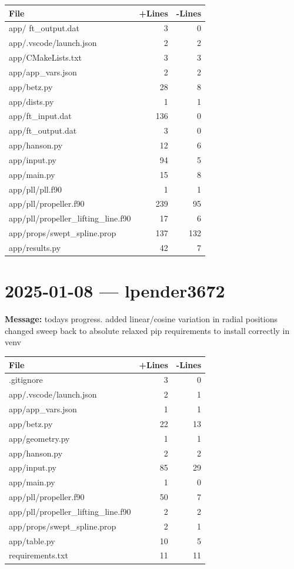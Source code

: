 \documentclass{article}
\begin{document}
\begin{longtable}{|p{10cm}|r|r|}
\hline \textbf{File} & \textbf{+Lines} & \textbf{-Lines} \\
\hline
app/ ft\_output.dat & 3 & 0 \\
\hline
app/.vscode/launch.json & 2 & 2 \\
\hline
app/CMakeLists.txt & 3 & 3 \\
\hline
app/app\_vars.json & 2 & 2 \\
\hline
app/betz.py & 28 & 8 \\
\hline
app/dists.py & 1 & 1 \\
\hline
app/ft\_input.dat & 136 & 0 \\
\hline
app/ft\_output.dat & 3 & 0 \\
\hline
app/hanson.py & 12 & 6 \\
\hline
app/input.py & 94 & 5 \\
\hline
app/main.py & 15 & 8 \\
\hline
app/pll/pll.f90 & 1 & 1 \\
\hline
app/pll/propeller.f90 & 239 & 95 \\
\hline
app/pll/propeller\_lifting\_line.f90 & 17 & 6 \\
\hline
app/props/swept\_spline.prop & 137 & 132 \\
\hline
app/results.py & 42 & 7 \\
\hline
\end{longtable}

\section*{2025-01-08 --- lpender3672}
\textbf{Message:} todays progress. added linear/cosine variation in radial positions changed sweep back to absolute relaxed pip requirements to install correctly in venv

\begin{longtable}{|p{10cm}|r|r|}
\hline \textbf{File} & \textbf{+Lines} & \textbf{-Lines} \\
\hline
.gitignore & 3 & 0 \\
\hline
app/.vscode/launch.json & 2 & 1 \\
\hline
app/app\_vars.json & 1 & 1 \\
\hline
app/betz.py & 22 & 13 \\
\hline
app/geometry.py & 1 & 1 \\
\hline
app/hanson.py & 2 & 2 \\
\hline
app/input.py & 85 & 29 \\
\hline
app/main.py & 1 & 0 \\
\hline
app/pll/propeller.f90 & 50 & 7 \\
\hline
app/pll/propeller\_lifting\_line.f90 & 2 & 2 \\
\hline
app/props/swept\_spline.prop & 2 & 1 \\
\hline
app/table.py & 10 & 5 \\
\hline
requirements.txt & 11 & 11 \\
\hline
\end{longtable}
\end{document}
